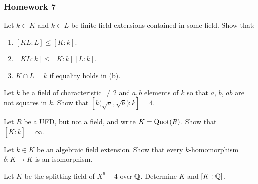 \subsubsection{Homework 7}
\setcounter{exercise}{0}
\setcounter{equation}{0}

\begin{problem}
  Let $k\subset K$ and $k\subset L$ be finite field extensions
  contained in some field. Show that:
  \begin{enumerate}[label=(\alph*),noitemsep]
  \item $[KL:L]\leq[K:k]$.
  \item $[KL:k]\leq[K:k][L:k]$.
  \item $K\cap L=k$ if equality holds in (b).
  \end{enumerate}
\end{problem}
\begin{solution}
\end{solution}

\begin{problem}
  Let $k$ be a field of characteristic $\neq 2$ and $a,b$ elements of
  $k$ so that $a$, $b$, $ab$ are not squares in $k$. Show that
  $\left[k{\bigl(\sqrt{a},\sqrt{b}\bigr)}:k\right]=4$.
\end{problem}
\begin{solution}
\end{solution}

\begin{problem}
  Let $R$ be a UFD, but not a field, and write $ K=\operatorname{Quot}(R)$. Show
  that $[\bar K:k]=\infty$.
\end{problem}
\begin{solution}
\end{solution}

\begin{problem}
  Let $k\in K$ be an algebraic field extension. Show that every
  $k$-homomorphism $\delta\colon K\to K$ is an isomorphism.
\end{problem}
\begin{solution}
\end{solution}

\begin{problem}
  Let $ K$ be the splitting field of $X^6-4$ over $\mathbb{Q}$. Determine
  $ K$ and $[ K:\mathbb{Q}]$.
\end{problem}
\begin{solution}
\end{solution}

